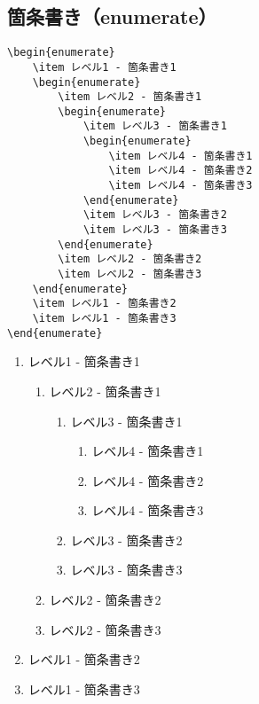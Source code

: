 \subsection{箇条書き（enumerate）}

\begin{verbatim}
\begin{enumerate}
    \item レベル1 - 箇条書き1
    \begin{enumerate}
        \item レベル2 - 箇条書き1
        \begin{enumerate}
            \item レベル3 - 箇条書き1
            \begin{enumerate}
                \item レベル4 - 箇条書き1
                \item レベル4 - 箇条書き2
                \item レベル4 - 箇条書き3
            \end{enumerate}
            \item レベル3 - 箇条書き2
            \item レベル3 - 箇条書き3
        \end{enumerate}
        \item レベル2 - 箇条書き2
        \item レベル2 - 箇条書き3
    \end{enumerate}
    \item レベル1 - 箇条書き2
    \item レベル1 - 箇条書き3
\end{enumerate}
\end{verbatim}

\begin{enumerate}
    \item レベル1 - 箇条書き1
    \begin{enumerate}
        \item レベル2 - 箇条書き1
        \begin{enumerate}
            \item レベル3 - 箇条書き1
            \begin{enumerate}
                \item レベル4 - 箇条書き1
                \item レベル4 - 箇条書き2
                \item レベル4 - 箇条書き3
            \end{enumerate}
            \item レベル3 - 箇条書き2
            \item レベル3 - 箇条書き3
        \end{enumerate}
        \item レベル2 - 箇条書き2
        \item レベル2 - 箇条書き3
    \end{enumerate}
    \item レベル1 - 箇条書き2
    \item レベル1 - 箇条書き3
\end{enumerate}
